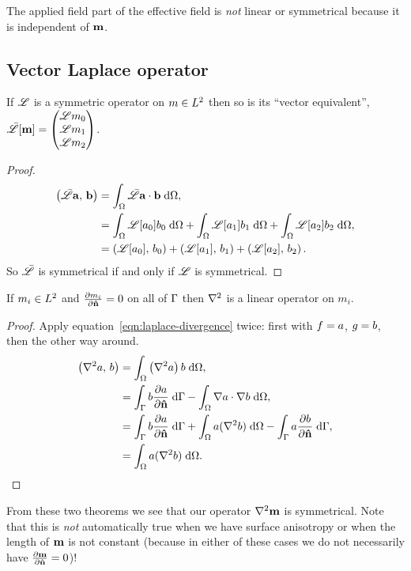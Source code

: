 The applied field part of the effective field is \emph{not} linear or symmetrical because it is independent of $\mv$.

\subsection{Vector Laplace operator}

\begin{theorem}
  If $\lop$ is a symmetric operator on $m \in \ltwo$ then so is its ``vector equivalent'', $\bar{\lop}[\mv] = \threevec{\lop m_0}{\lop m_1}{\lop m_2}$.
\end{theorem}

\begin{proof}
  \begin{equation}
    \begin{aligned}
      \ip{\bar{\lop}\av}{\bv} &= \intd{ \bar{\lop} \av \cdot \bv}, \\
      &= \intd{\lop[a_0] b_0} + \intd{\lop[a_1] b_1} + \intd{\lop[a_2] b_2}, \\
      & = \ip{\lop[a_0]}{b_0} + \ip{\lop[a_1]}{b_1} + \ip{\lop[a_2]}{b_2}.
    \end{aligned}
  \end{equation}
  So $\bar{\lop}$ is symmetrical if and only if $\lop$ is symmetrical.
\end{proof}

\begin{theorem}
  If $m_i \in \ltwo$ and $\ddn{m_i} = 0$ on all of $\boundd$ then $\lap$ is a linear operator on $m_i$.
\end{theorem}
\begin{proof}
  Apply equation~\cref{eqn:laplace-divergence} twice: first with $\ff = a$, $\gf = b$, then the other way around.
  \begin{equation}
    \begin{aligned}
      \ip{\lap a}{b} &= \intd{\left(\lap a \right) b}, \\
      &= \intb{b \ddn{a}} - \intd{\nabla a \cdot \nabla b}, \\
      &= \intb{b \ddn{a}} + \intd{a (\lap b)} - \intb{a \ddn{b}}, \\
      &= \intd{a (\lap b)}.
    \end{aligned}
  \end{equation}
\end{proof}

From these two theorems we see that our operator $\lap \mv$ is symmetrical. Note that this is \emph{not} automatically true when we have surface anisotropy or when the length of $\mv$ is not constant (because in either of these cases we do not necessarily have $\ddn{\mv} = 0$)!

